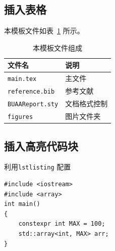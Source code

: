 \documentclass[12pt,a4paper,UTF8,fontset=none]{ctexart}
\begin{document}

\subsection{插入表格}
本模板文件如表~\ref{doc} 所示。
\begin{table}[!htbp]
    \centering
    \begin{tabular}{l  | l}
    \hline
        文件名 & 说明 \\
        \hline
        \texttt{main.tex}  & 主文件 \\
        \texttt{reference.bib} & 参考文献 \\
        \texttt{BUAAReport.sty}  & 文档格式控制\\
        \texttt{figures}  & 图片文件夹 \\
        \hline
    \end{tabular}
    \caption{本模板文件组成}
    \label{doc}
\end{table}

%
%
%
%
%
%

\subsection{插入高亮代码块}
利用\verb|lstlisting| 配置
\begin{lstlisting}[style=CPP, title="c++代码"]
#include <iostream>
#include <array>
int main()
{
    constexpr int MAX = 100;
    std::array<int, MAX> arr;
}  
\end{lstlisting}
\end{document}
